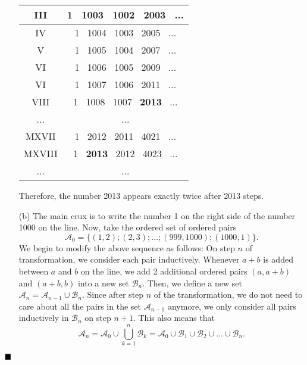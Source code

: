 \documentclass[11pt]{article}
\newenvironment{solution}[1][Solution]{%
  \proof[\normalfont \faPenNib \hspace{0.2cm} \ttfamily \scshape \large #1]%
}{\(\hfill \blacksquare\){\parfillskip0pt\par}}
\theoremstyle{definition}
\newcommand{\boom}{\vspace{0.25cm}}
\begin{document}
\begin{solution}
\begin{enumerate}
                \begin{center}
                    \begin{tabular}{ |c|c| } 
                        \hline
                        III & 1 \ 1003 \ 1002 \ 2003 \ ... \\
                        \hline
                        IV & 1 \ 1004 \ 1003 \ 2005 \ ... \\
                        \hline
                        V & 1 \ 1005 \ 1004 \ 2007 \ ... \\
                        \hline
                        VI & 1 \ 1006 \ 1005 \ 2009 \ ... \\
                        \hline
                        VI & 1 \ 1007 \ 1006 \ 2011 \ ... \\
                        \hline
                        VIII & 1 \ 1008 \ 1007 \ \textbf{2013} \ ... \\
                        \hline
                        ... & ... \\
                        \hline
                        MXVII & 1 \ 2012 \ 2011 \ 4021 \ ... \\
                        \hline
                        MXVIII & 1 \ \textbf{2013} \ 2012 \ 4023 \ ... \\
                        \hline
                        ... & ... \\
                        \hline
                    \end{tabular}
                \end{center}
                
                \boom
                
                Therefore, the number 2013 appears exactly twice after 2013 steps.
                
                \item[(b)] The main crux is to write the number 1 on the right side of the number 1000 on the line. Now, take the ordered set of ordered pairs
                \[\mathcal{A}_0 = \{(1,2); (2,3); \dots; (999,1000); (1000,1)\}.\]
                We begin to modify the above sequence as follows: On step \(n\) of transformation, we consider each pair inductively. Whenever \(a + b\) is added between \(a\) and \(b\) on the line, we add 2 additional ordered pairs \((a,a + b)\) and \((a + b,b)\) into a new set \(\mathcal{B}_n\). Then, we define a new set \(\mathcal{A}_n = \mathcal{A}_{n-1} \cup \mathcal{B}_n\). Since after step \(n\) of the transformation, we do not need to care about all the pairs in the set \(\mathcal{A}_{n-1}\) anymore, we only consider all pairs inductively in \(\mathcal{B}_n\) on step \(n + 1\). This also means that
                \[\mathcal{A}_n = \mathcal{A}_0 \cup \bigcup_{k=1}^n \mathcal{B}_k = \mathcal{A}_0 \cup \mathcal{B}_1 \cup \mathcal{B}_2 \cup \dots \cup \mathcal{B}_n.\]


\end{enumerate}
\end{solution}
\end{document}
